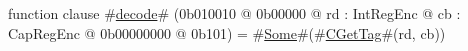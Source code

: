 function clause #\hyperref[sailMIPSzdecode]{decode}# (0b010010 @ 0b00000 @ rd : IntRegEnc @ cb : CapRegEnc @ 0b00000000 @ 0b101) = #\hyperref[sailMIPSzSome]{Some}#(#\hyperref[sailMIPSzCGetTag]{CGetTag}#(rd, cb))
